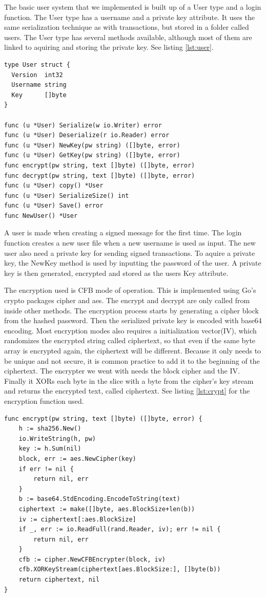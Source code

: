 \documentclass[12pt]{article}
\begin{document}
The basic user system that we implemented is built up of a User type and a login function. The User type has a username and a private key attribute. It uses the same serialization technique as with transactions, but stored in a folder called users. The User type has several methods available, although most of them are linked to aquiring and storing the private key. See listing \ref{lst:user}.

\begin{lstlisting}[float=h!,caption={User},label=lst:user]
type User struct {
  Version  int32
  Username string
  Key      []byte
}

func (u *User) Serialize(w io.Writer) error 
func (u *User) Deserialize(r io.Reader) error 
func (u *User) NewKey(pw string) ([]byte, error)
func (u *User) GetKey(pw string) ([]byte, error) 
func encrypt(pw string, text []byte) ([]byte, error) 
func decrypt(pw string, text []byte) ([]byte, error) 
func (u *User) copy() *User 
func (u *User) SerializeSize() int 
func (u *User) Save() error 
func NewUser() *User 
\end{lstlisting}

A user is made when creating a signed message for the first time. The login function creates a new user file when a new username is used as input. The new user also need a private key for sending signed transactions. To aquire a private key, the NewKey method is used by inputting the password of the user. A private key is then generated, encrypted and stored as the users Key attribute. 

The encryption used is CFB mode of operation. This is implemented using Go's crypto packages cipher and aes. The encrypt and decrypt are only called from inside other methods. The encryption process starts by generating a cipher block from the hashed password. Then the serialized private key is encoded with base64 encoding. Most encryption modes also requires a initialization vector(IV), which randomizes the encrypted string called ciphertext, so that even if the same byte array is encrypted again, the ciphertext will be different. Because it only needs to be unique and not secure, it is common practice to add it to the beginning of the ciphertext. The encrypter we went with needs the block cipher and the IV. Finally it XORs each byte in the slice with a byte from the cipher's key stream and returns the encrypted text, called ciphertext. See listing \ref{lst:crypt} for the encryption function used.

\begin{lstlisting}[float=h!,caption={Encryption},label=lst:crypt]
func encrypt(pw string, text []byte) ([]byte, error) {
	h := sha256.New()
	io.WriteString(h, pw)
	key := h.Sum(nil)
	block, err := aes.NewCipher(key)
	if err != nil {
		return nil, err
	}
	b := base64.StdEncoding.EncodeToString(text)
	ciphertext := make([]byte, aes.BlockSize+len(b))
	iv := ciphertext[:aes.BlockSize]
	if _, err := io.ReadFull(rand.Reader, iv); err != nil {
		return nil, err
	}
	cfb := cipher.NewCFBEncrypter(block, iv)
	cfb.XORKeyStream(ciphertext[aes.BlockSize:], []byte(b))
	return ciphertext, nil
}
\end{lstlisting}
\end{document}
